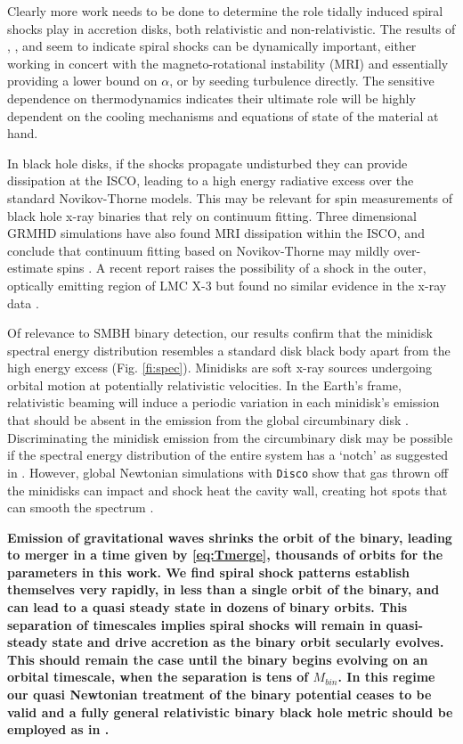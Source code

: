 \documentclass{emulateapj}
\newcommand{\al}{\alpha}
\newcommand{\Disco}{{\texttt{Disco}}}
\begin{document}
Clearly more work needs to be done to determine the role tidally induced spiral shocks play in accretion disks, both relativistic and non-relativistic.  The results of \cite{Ju16}, \cite{Zhu16}, and \cite{Bae16} seem to indicate spiral shocks can be dynamically important, either working in concert with the magneto-rotational instability (MRI) and essentially providing a lower bound on $\al$, or by seeding turbulence directly.  The sensitive dependence on thermodynamics indicates their ultimate role will be highly dependent on the cooling mechanisms and equations of state of the material at hand.

In black hole disks, if the shocks propagate undisturbed they can provide dissipation at the ISCO, leading to a high energy radiative excess over the standard Novikov-Thorne models.  This may be relevant for spin measurements of black hole x-ray binaries that rely on continuum fitting. Three dimensional GRMHD simulations have also found MRI dissipation within the ISCO, and conclude that continuum fitting based on Novikov-Thorne may mildly over-estimate spins \citep{Penna10, Noble10, Kulkarni11, Schnittman15}.  A recent report raises the possibility of a shock in the outer, optically emitting region of LMC X-3 but found no similar evidence in the x-ray data \citep{Steiner14}.

Of relevance to SMBH binary detection, our results confirm that the minidisk spectral energy distribution resembles a standard disk black body apart from the high energy excess (Fig. \ref{fi:spec}).  Minidisks are soft x-ray sources undergoing orbital motion at potentially relativistic velocities.  In the Earth's frame, relativistic beaming will induce a periodic variation in each minidisk's emission that should be absent in the emission from the global circumbinary disk \citep{DOrazio15}.  Discriminating the minidisk emission from the circumbinary disk may be possible if the spectral energy distribution of the entire system has a `notch' as suggested in \cite{Roedig14}.  However, global Newtonian simulations with \Disco{} show that gas thrown off the minidisks can impact and shock heat the cavity wall, creating hot spots that can smooth the spectrum \citep{Farris15A}.

{\bf Emission of gravitational waves shrinks the orbit of the binary, leading to merger in a time given by \eqref{eq:Tmerge}, thousands of orbits for the parameters in this work.  We find spiral shock patterns establish themselves very rapidly, in less than a single orbit of the binary, and can lead to a quasi steady state in dozens of binary orbits.  This separation of timescales implies spiral shocks will remain in quasi-steady state and drive accretion as the binary orbit secularly evolves.  This should remain the case until the binary begins evolving on an orbital timescale, when the separation is tens of $M_{bin}$. In this regime our quasi Newtonian treatment of the binary potential ceases to be valid and a fully general relativistic binary black hole metric should be employed as in \cite{Farris12,Noble12,Zilhao15}.}
\end{document}
